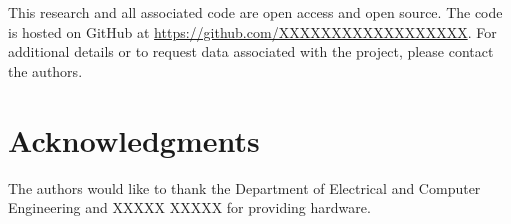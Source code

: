 \documentclass[conference]{IEEEtran}
\begin{document}
This research and all associated code are open access and open source.
The code is hosted on GitHub at \url{https://github.com/XXXXXXXXXXXXXXXXXX}.
For additional details or to request data associated with the project, please
contact the authors.






\section*{Acknowledgments}

The authors would like to thank the Department of Electrical and Computer
Engineering and XXXXX XXXXX for providing hardware.














\end{document}
